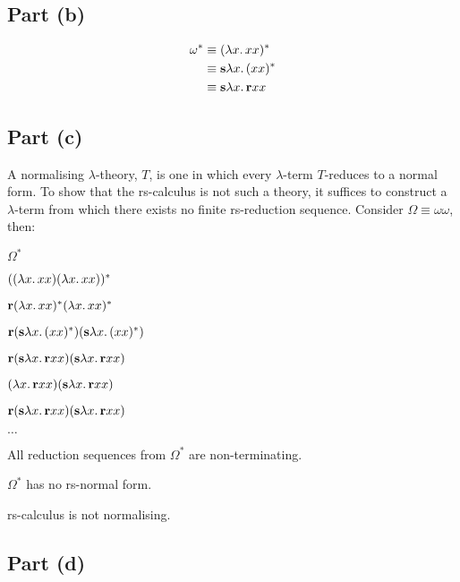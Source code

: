 \subsection{Part (b)}\label{sec:q-2-b}

\begin{align*}
  \omega^* & \equiv (\lambda x\ldotp xx)^*\\
  & \equiv \mathbf{s}\lambda x\ldotp (xx)^*\\
  & \equiv \mathbf{s}\lambda x\ldotp \mathbf{r}xx
\end{align*}

\subsection{Part (c)}\label{sec:q-2-c}

A normalising $\lambda$-theory, $T$, is one in which every $\lambda$-term $T$-reduces to a normal form. To show that the rs-calculus is not such a theory, it suffices to construct a $\lambda$-term from which there exists no finite rs-reduction sequence. Consider $\Omega\equiv\omega\omega$, then:

\begin{itemize}

  \step $\Omega^*$

  \step[\equiv] $((\lambda x\ldotp xx)(\lambda x\ldotp xx))^*$

  \step[\equiv] $\mathbf{r}(\lambda x\ldotp xx)^*(\lambda x\ldotp xx)^*$

  \step[\equiv] $\mathbf{r}(\mathbf{s}\lambda x\ldotp (xx)^*)(\mathbf{s}\lambda x\ldotp (xx)^*)$

  \step[\equiv] $\mathbf{r}(\mathbf{s}\lambda x\ldotp \mathbf{r}xx)(\mathbf{s}\lambda x\ldotp \mathbf{r}xx)$

  \step[\to_{\text rs}] $(\lambda x\ldotp \mathbf{r}xx)(\mathbf{s}\lambda x\ldotp \mathbf{r}xx)$

  \step[\to_{\text rs}] $\mathbf{r}(\mathbf{s}\lambda x\ldotp \mathbf{r}xx)(\mathbf{s}\lambda x\ldotp \mathbf{r}xx)$

  \step[\to_{\text rs}] $\ldots$

  \step[\imps] All reduction sequences from $\Omega^*$ are non-terminating.

  \step[\imps] $\Omega^*$ has no rs-normal form.

  \step[\imps] rs-calculus is not normalising.
\end{itemize}

\subsection{Part (d)}\label{sec:q-2-d}

